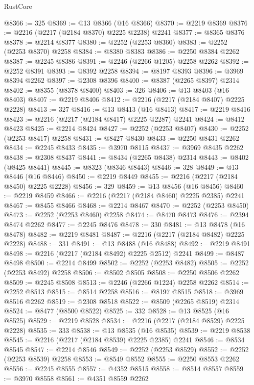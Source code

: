 \begin{lexlean}{RustCore}
\begin{coremodule}
@8366 := 325
@8369 := @13 @8366 (@16 @8366)
@8370 := @2219 @8369
@8376 := @2216 (@2217 (@2184 @8370) @2225 @2238) @2241
@8377 := @8365 @8376
@8378 := @2214 @8377
@8380 := @2252 (@2253 @8360)
@8383 := @2252 (@2253 @8370) @2258
@8384 := @8380 @8383
@8386 := @2250 @8384 @2262
@8387 := @2245 @8386
@8391 := @2246 (@2266 @1205) @2258 @2262
@8392 := @2252 @8391
@8393 := @8392 @2258
@8394 := @8197 @8393
@8396 := @3969 @8394 @2262
@8397 := @2308 @8396
@8400 := @8387 (@2265 @8397) @2314
@8402 := @8355 (@8378 @8400)
@8403 := 326
@8406 := @13 @8403 (@16 @8403)
@8407 := @2219 @8406
@8412 := @2216 (@2217 (@2184 @8407) @2225 @2228)
@8413 := 327
@8416 := @13 @8413 (@16 @8413)
@8417 := @2219 @8416
@8423 := @2216 (@2217 (@2184 @8417) @2225 @2287) @2241
@8424 := @8412 @8423
@8425 := @2214 @8424
@8427 := @2252 (@2253 @8407)
@8430 := @2252 (@2253 @8417) @2258
@8431 := @8427 @8430
@8433 := @2250 @8431 @2262
@8434 := @2245 @8433
@8435 := @3970 @8115
@8437 := @3969 @8435 @2262
@8438 := @2308 @8437
@8441 := @8434 (@2265 @8438) @2314
@8443 := @8402 (@8425 @8441)
@8445 := @8323 (@8346 @8443)
@8446 := 328
@8449 := @13 @8446 (@16 @8446)
@8450 := @2219 @8449
@8455 := @2216 (@2217 (@2184 @8450) @2225 @2228)
@8456 := 329
@8459 := @13 @8456 (@16 @8456)
@8460 := @2219 @8459
@8466 := @2216 (@2217 (@2184 @8460) @2225 @2385) @2241
@8467 := @8455 @8466
@8468 := @2214 @8467
@8470 := @2252 (@2253 @8450)
@8473 := @2252 (@2253 @8460) @2258
@8474 := @8470 @8473
@8476 := @2394 @8474 @2262
@8477 := @2245 @8476
@8478 := 330
@8481 := @13 @8478 (@16 @8478)
@8482 := @2219 @8481
@8487 := @2216 (@2217 (@2184 @8482) @2225 @2228)
@8488 := 331
@8491 := @13 @8488 (@16 @8488)
@8492 := @2219 @8491
@8498 := @2216 (@2217 (@2184 @8492) @2225 @2512) @2241
@8499 := @8487 @8498
@8500 := @2214 @8499
@8502 := @2252 (@2253 @8482)
@8505 := @2252 (@2253 @8492) @2258
@8506 := @8502 @8505
@8508 := @2250 @8506 @2262
@8509 := @2245 @8508
@8513 := @2246 (@2266 @1224) @2258 @2262
@8514 := @2252 @8513
@8515 := @8514 @2258
@8516 := @8197 @8515
@8518 := @3969 @8516 @2262
@8519 := @2308 @8518
@8522 := @8509 (@2265 @8519) @2314
@8524 := @8477 (@8500 @8522)
@8525 := 332
@8528 := @13 @8525 (@16 @8525)
@8529 := @2219 @8528
@8534 := @2216 (@2217 (@2184 @8529) @2225 @2228)
@8535 := 333
@8538 := @13 @8535 (@16 @8535)
@8539 := @2219 @8538
@8545 := @2216 (@2217 (@2184 @8539) @2225 @2385) @2241
@8546 := @8534 @8545
@8547 := @2214 @8546
@8549 := @2252 (@2253 @8529)
@8552 := @2252 (@2253 @8539) @2258
@8553 := @8549 @8552
@8555 := @2250 @8553 @2262
@8556 := @2245 @8555
@8557 := @4352 @8515
@8558 := @8514 @8557
@8559 := @3970 @8558
@8561 := @4351 @8559 @2262

\end{coremodule}
\end{lexlean}
